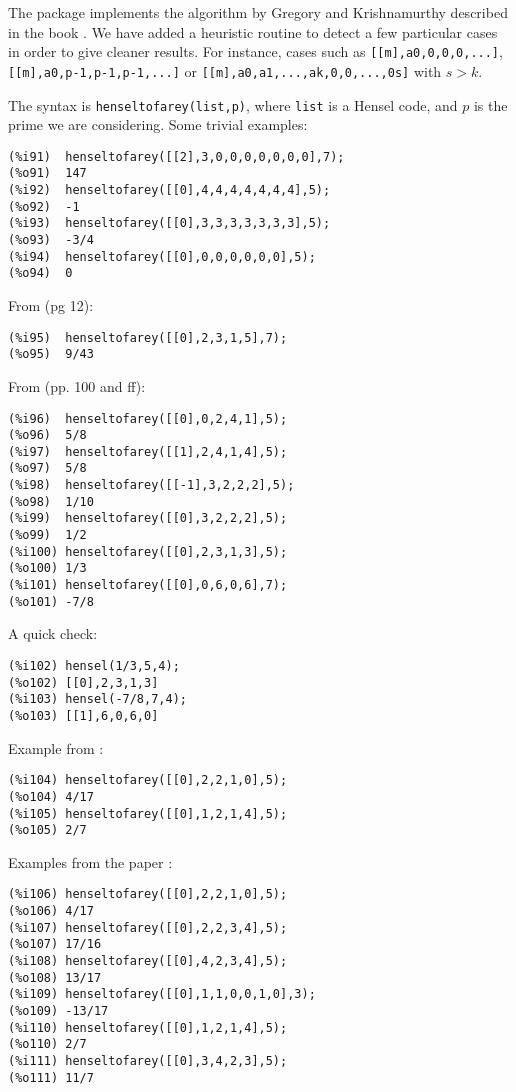 \documentclass[fleqn]{cas-sc}
\begin{document}
The package implements the algorithm by Gregory and Krishnamurthy
described in the book \cite{7}. We have added a heuristic routine
to detect a few particular cases in order to give cleaner results.
For instance, cases such as 
\texttt{[[m],a0,0,0,0,...]},\texttt{[[m],a0,p-1,p-1,p-1,...]} or 
\texttt{[[m],a0,a1,...,ak,0,0,...,0s]}
with $s>k$.

The syntax is \texttt{henseltofarey(list,p)}, where \texttt{list} is
a Hensel code, and $p$ is the prime we are considering.
Some trivial examples:
\begin{verbatim}
(%i91)	henseltofarey([[2],3,0,0,0,0,0,0,0],7);
(%o91)	147
(%i92)	henseltofarey([[0],4,4,4,4,4,4,4],5);
(%o92)	-1
(%i93)	henseltofarey([[0],3,3,3,3,3,3,3],5);
(%o93)	-3/4
(%i94)	henseltofarey([[0],0,0,0,0,0,0],5);
(%o94)	0
\end{verbatim}

From \cite{6} (pg 12):
\begin{verbatim}
(%i95)	henseltofarey([[0],2,3,1,5],7);
(%o95)	9/43
\end{verbatim}

From \cite{7} (pp. 100 and ff):
\begin{verbatim}
(%i96)	henseltofarey([[0],0,2,4,1],5);
(%o96)	5/8
(%i97)	henseltofarey([[1],2,4,1,4],5);
(%o97)	5/8
(%i98)	henseltofarey([[-1],3,2,2,2],5);
(%o98)	1/10
(%i99)	henseltofarey([[0],3,2,2,2],5);
(%o99)	1/2
(%i100)	henseltofarey([[0],2,3,1,3],5);
(%o100)	1/3
(%i101)	henseltofarey([[0],0,6,0,6],7);
(%o101)	-7/8
\end{verbatim}

A quick check:
\begin{verbatim}
(%i102)	hensel(1/3,5,4);
(%o102)	[[0],2,3,1,3]
(%i103)	hensel(-7/8,7,4);
(%o103)	[[1],6,0,6,0]
\end{verbatim}

Example from \cite{11}:
\begin{verbatim}
(%i104)	henseltofarey([[0],2,2,1,0],5);
(%o104)	4/17
(%i105)	henseltofarey([[0],1,2,1,4],5);
(%o105)	2/7
\end{verbatim}

Examples from the paper \cite{8}:
\begin{verbatim}
(%i106)	henseltofarey([[0],2,2,1,0],5);
(%o106)	4/17
(%i107)	henseltofarey([[0],2,2,3,4],5);
(%o107)	17/16
(%i108)	henseltofarey([[0],4,2,3,4],5);
(%o108)	13/17
(%i109)	henseltofarey([[0],1,1,0,0,1,0],3);
(%o109)	-13/17
(%i110)	henseltofarey([[0],1,2,1,4],5);
(%o110)	2/7
(%i111)	henseltofarey([[0],3,4,2,3],5);
(%o111)	11/7
\end{verbatim}
\end{document}
